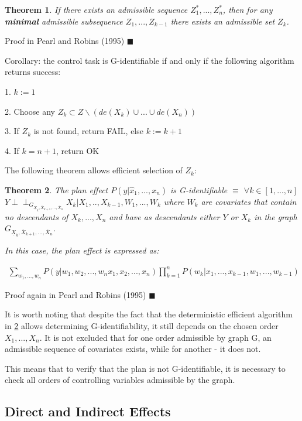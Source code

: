 \documentclass[fleqn]{article}
\newcommand{\independent}{\perp \!\!\! \perp}
\newtheorem{theorem}{Theorem}
\numberwithin{equation}{section}
\numberwithin{theorem}{section}
\numberwithin{figure}{section}
\numberwithin{lemma}{section}
\numberwithin{corollary}{section}
\begin{document}
\begin{theorem}
	If there exists an admissible sequence $Z_1^*,...,Z_n^*$, then for any \textbf{minimal} admissible subsequence $Z_1,...,Z_{k-1}$ there exists an admissible set $Z_k$.
\end{theorem}

Proof in Pearl and Robins (1995) $\blacksquare$

Corollary: the control task is G-identifiable if and only if the following algorithm returns success:

1. $k := 1$

2. Choose any $Z_k \subset Z \backslash (de(X_k) \cup ... \cup de(X_n))$ 

3. If $Z_k$ is not found, return FAIL, else $k := k + 1$

4. If $k = n + 1$, return OK

The following theorem allows efficient selection of $Z_k$:

\begin{theorem}
	\label{th:plan_identification}
	The plan effect $P(y|\hat x_1,...,x_n)$ is G-identifiable $\equiv$ $\forall k \in [1,...,n]$ $Y \independent_{G_{\underline{X}_k,\overline{X}_{k+1},...,\overline{X}_n}}X_k | X_1,..,X_{k-1},W_1,...,W_k$ where $W_k$ are covariates that contain no descendants of $X_k,...,X_n$ and have as descendants either $Y$ or $X_k$ in the graph $G_{\underline{X}_k,\overline{X}_{k+1},...,\overline{X}_n}$. 
	
	In this case, the plan effect is expressed as:
	
	\begin{align}
		\sum\limits_{w_1,...,w_n}P(y|w_1, w_2,...,w_n x_1, x_2,...,x_n)\prod\limits_{k=1}^nP(w_k|x_1,...,x_{k-1},w_1,...,w_{k-1})
	\end{align}
\end{theorem}

Proof again in Pearl and Robins (1995) $\blacksquare$

It is worth noting that despite the fact that the deterministic efficient algorithm in \ref{th:plan_identification} allows determining G-identifiability, it still depends on the chosen order $X_1,...,X_n$. It is not excluded that for one order admissible by graph G, an admissible sequence of covariates exists, while for another - it does not.

This means that to verify that the plan is not G-identifiable, it is necessary to check all orders of controlling variables admissible by the graph.

\subsection*{Direct and Indirect Effects}
\end{document}
